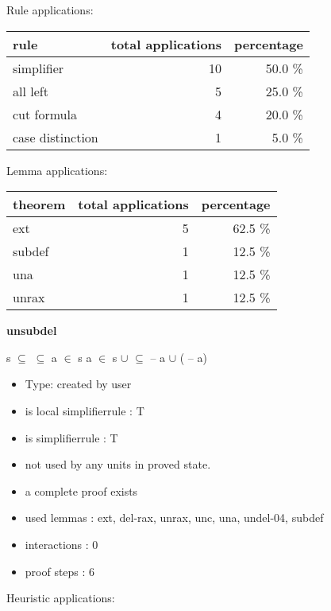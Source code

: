 \documentclass[a4paper]{article}
\begin{document}
Rule applications:

\begin{supertabular}{l|r|r}
rule	        & total applications & percentage \\ \hline
simplifier & 10 & 50.0 \% \\
all left & 5 & 25.0 \% \\
cut formula & 4 & 20.0 \% \\
case distinction & 1 & 5.0 \% \\

\end{supertabular}

Lemma applications:

\begin{supertabular}{l|r|r}
theorem	        & total applications & percentage \\ \hline
ext & 5 & 62.5 \% \\
subdef & 1 & 12.5 \% \\
una & 1 & 12.5 \% \\
unrax & 1 & 12.5 \% \\

\end{supertabular}
\pagebreak

{\LARGE\bf unsubdel}\label{lemma-unsubdel}

\medskip

 \Fol s $\subseteq$  \And {} $\subseteq$  \And \Not a $\in$ s \And \Not a $\in$  \Imp s $\cup$  $\subseteq$  -- a $\cup$ ( -- a)

\begin{itemize}

\item Type: created by user

\item is local simplifierrule : T
\item is simplifierrule : T
\item not used by any units in proved state.
\item       a complete proof exists
\item       used lemmas  : ext, del-rax, unrax, unc, una, undel-04, subdef
\item       interactions : 0
\item       proof steps  : 6
\end{itemize}

\medskip


Heuristic applications:
\end{document}
